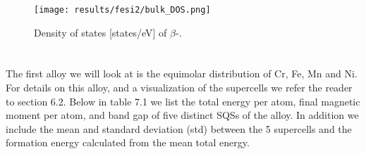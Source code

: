 \begin{figure}[H]
\centering
\texttt{[image: results/fesi2/bulk\_DOS.png]}
\caption{Density of states [states/eV] of $\beta$-.}
\end{figure}
 

\section{}
The first alloy we will look at is the equimolar distribution of Cr, Fe, Mn and Ni. For details on this alloy, and a visualization of the supercells we refer the reader to section 6.2. Below in table 7.1 we list the total energy per atom, final magnetic moment per atom, and band gap of five distinct SQSs of the  alloy. In addition we include the mean and standard deviation (std) between the 5 supercells and the formation energy calculated from the mean total energy. 
 
